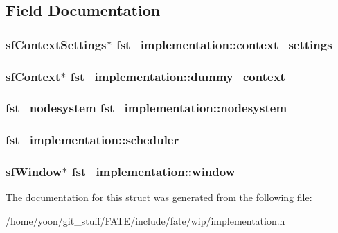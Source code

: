 \subsection{Field Documentation}
\hypertarget{structfst__implementation_a2a067b83ea76571943500a454ddb170a}{
\subsubsection[{context\-\_\-settings}]{\setlength{\rightskip}{0pt plus 5cm}sf\-Context\-Settings$\ast$ fst\-\_\-implementation\-::context\-\_\-settings}}\label{structfst__implementation_a2a067b83ea76571943500a454ddb170a}
\hypertarget{structfst__implementation_ad4da93c7e29a8c1ed6179dbee3b47f5f}{
\subsubsection[{dummy\-\_\-context}]{\setlength{\rightskip}{0pt plus 5cm}sf\-Context$\ast$ fst\-\_\-implementation\-::dummy\-\_\-context}}\label{structfst__implementation_ad4da93c7e29a8c1ed6179dbee3b47f5f}
\hypertarget{structfst__implementation_a8efbeacbace3596749b8a71b0502aa37}{
\subsubsection[{nodesystem}]{\setlength{\rightskip}{0pt plus 5cm}fst\-\_\-nodesystem fst\-\_\-implementation\-::nodesystem}}\label{structfst__implementation_a8efbeacbace3596749b8a71b0502aa37}
\hypertarget{structfst__implementation_a88a18917674c0933358fbca6b993c899}{
\subsubsection[{scheduler}]{ fst\-\_\-implementation\-::scheduler}}\label{structfst__implementation_a88a18917674c0933358fbca6b993c899}
\hypertarget{structfst__implementation_a0bdd3e90cfd4d7b19366c03fa37d34a4}{
\subsubsection[{window}]{\setlength{\rightskip}{0pt plus 5cm}sf\-Window$\ast$ fst\-\_\-implementation\-::window}}\label{structfst__implementation_a0bdd3e90cfd4d7b19366c03fa37d34a4}


The documentation for this struct was generated from the following file\-:\begin{DoxyCompactItemize}
\item 
/home/yoon/git\-\_\-stuff/\-F\-A\-T\-E/include/fate/wip/implementation.\-h\end{DoxyCompactItemize}
